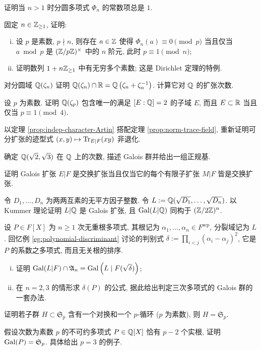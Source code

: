 \begin{Exercises}
	\item 证明当 $n > 1$ 时分圆多项式 $\Phi_n$ 的常数项总是 $1$.
	\item 固定 $n \in \mathbb{Z}_{\geq 1}$, 证明:
		\begin{enumerate}[(i)]
			\item 设 $p$ 是素数, $p \nmid n$, 则存在 $a \in \mathbb{Z}$ 使得 $\Phi_n(a) \equiv 0 \pmod p$ 当且仅当 $a \bmod p$ 是 $(\mathbb{Z}/p\mathbb{Z})^\times$ 中的 $n$ 阶元, 此时 $p \equiv 1 \pmod n$;
			\item 证明数列 $1 + n\mathbb{Z}_{\geq 1}$ 中有无穷多个素数; 这是 Dirichlet 定理的特例.
		\end{enumerate}
	\item 对分圆域 $\mathbb{Q}(\zeta_n)$ 证明 $\mathbb{Q}(\zeta_n) \cap \mathbb{R} = \mathbb{Q}\left( \zeta_n + \zeta_n^{-1} \right)$. 计算它对 $\mathbb{Q}$ 的扩张次数.
	\item 设 $p$ 为素数. 证明 $\mathbb{Q}(\zeta_p)$ 包含唯一的满足 $[E:\mathbb{Q}]=2$ 的子域 $E$, 而且 $E \subset \mathbb{R}$ 当且仅当 $p \equiv 1 \pmod{4}$.
	\item 以定理 \ref{prop:indep-character-Artin} 搭配定理 \ref{prop:norm-trace-field}, 重新证明可分扩张的迹型式 $(x,y) \mapsto \operatorname{Tr}_{E|F}(xy)$ 非退化.
	\item 确定 $\mathbb{Q}(\sqrt{2},\sqrt{3})$ 在 $\mathbb{Q}$ 上的次数, 描述 Galois 群并给出一组正规基.
	\item 证明 Galois 扩张 $E|F$ 是交换扩张当且仅当它的每个有限子扩张 $M|F$ 皆是交换扩张.
	\item 令 $D_1, \ldots, D_n$ 为两两互素的无平方因子整数. 令 $L := \mathbb{Q}(\sqrt{D_1}, \ldots, \sqrt{D_n})$. 以 Kummer 理论证明 $L|\mathbb{Q}$ 是 Galois 扩张, 且 $\operatorname{Gal}(L|\mathbb{Q})$ 同构于 $(\mathbb{Z}/2\mathbb{Z})^n$.
	\item 设 $P \in F[X]$ 为 $n \geq 1$ 次无重根多项式, 其根记为 $\alpha_1, \ldots, \alpha_n \in F^\text{sep}$, 分裂域记为 $L$. 回忆例 \ref{eg:polynomial-discriminant} 讨论的判别式 $\delta := \prod_{i < j} (\alpha_i - \alpha_j)^2$, 它是 $P$ 的系数之多项式, 而且无关根的排序.
		\begin{enumerate}[(i)]
			\item 证明 $\operatorname{Gal}(L|F) \cap \mathfrak{A}_n = \operatorname{Gal}\left( L \;|\; F(\sqrt{\delta}) \right)$;
			\item 在 $n=2, 3$ 的情形求 $\delta(P)$ 的公式, 据此给出判定三次多项式的 Galois 群的一套办法.
		\end{enumerate}
	\item 证明若子群 $H \subset \mathfrak{S}_p$ 含有一个对换和一个 $p$-循环 ($p$ 为素数), 则 $H = \mathfrak{S}_p$.
	\item 假设次数为素数 $p$ 的不可约多项式 $P \in \mathbb{Q}[X]$ 恰有 $p-2$ 个实根, 证明 $\operatorname{Gal}(P) = \mathfrak{S}_p$. 具体给出 $p=3$ 的例子.

\end{Exercises}
